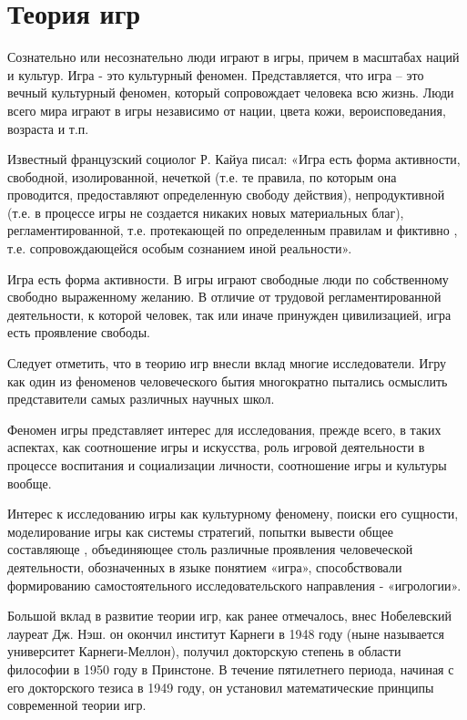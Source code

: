 \documentclass[12pt, a4paper]{article}
\let\stdsection\section
\renewcommand\section{\newpage\stdsection}
\begin{document}
\section{Теория игр}
Сознательно или несознательно люди играют в игры, причем в масштабах наций и
культур. Игра - это культурный феномен.
Представляется, что игра – это вечный культурный феномен, который сопровождает
человека всю жизнь. Люди всего мира играют в игры независимо от нации, цвета
кожи, вероисповедания, возраста и т.п.

Известный французский социолог Р. Кайуа писал: «Игра есть форма активности,
свободной, изолированной, нечеткой (т.е. те правила, по которым она
проводится, предоставляют определенную свободу действия), непродуктивной
(т.е. в процессе игры не создается никаких новых материальных благ),
регламентированной, т.е. протекающей по определенным правилам и фиктивно
, т.е. сопровождающейся особым сознанием иной реальности»\cite{ka07}.

Игра есть форма активности. В игры играют свободные люди по собственному
свободно выраженному желанию. В отличие от трудовой регламентированной
деятельности, к которой человек, так или иначе принужден цивилизацией, игра
есть проявление свободы.

Следует отметить, что в теорию игр внесли вклад многие исследователи. 
Игру как один из феноменов человеческого бытия многократно пытались
осмыслить представители самых различных научных школ.

Феномен игры представляет интерес для исследования, прежде всего, в таких
аспектах, как соотношение игры и искусства, роль игровой деятельности в
процессе воспитания и социализации личности, соотношение игры и культуры
вообще.

Интерес к исследованию игры как культурному феномену, поиски его сущности,
моделирование игры как системы стратегий, попытки вывести общее составляюще
, объединяющее столь различные проявления человеческой деятельности,
обозначенных в языке понятием «игра», способствовали формированию
самостоятельного исследовательского направления - «игрологии»\cite{ap07}.

Большой вклад в развитие теории игр, как ранее отмечалось, внес Нобелевский
лауреат Дж. Нэш. он окончил институт
Карнеги в 1948 году (ныне называется университет Карнеги-Меллон), получил
докторскую степень в области философии в 1950 году в Принстоне. В течение
пятилетнего периода, начиная с его докторского тезиса в 1949 году, он
установил математические принципы современной теории игр.
\end{document}
